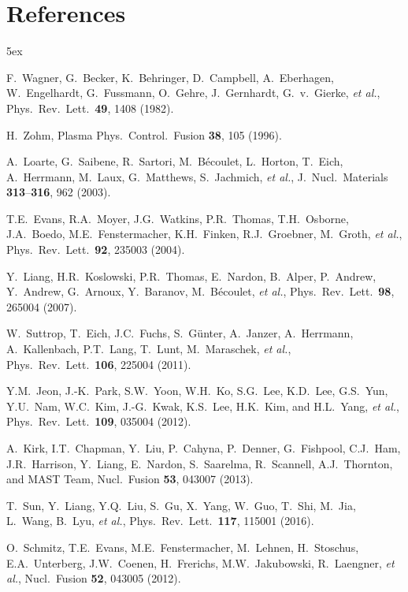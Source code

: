 \documentclass[12pt,prb,aps]{revtex4-1}
\begin{document}
\section*{References}
\begin{thebibliography}{99}\baselineskip 5ex

 F.~Wagner, G.~Becker, K.~Behringer, D.~Campbell, A.~Eberhagen, W.~Engelhardt, G.~Fussmann, O.~Gehre, J.~Gernhardt, G.~v.~Gierke, {\it et al.}, 
Phys.\ Rev.\ Lett.\ {\bf 49}, 1408 (1982).

 H.~Zohm, Plasma Phys.\ Control.\ Fusion {\bf 38}, 105 (1996).

 A.~Loarte, G.~Saibene, R.~Sartori, M.~B\'{e}coulet, L.~Horton, T.~Eich, A.~Herrmann, M.~Laux, G.~Matthews, S.~Jachmich, {\it et al.},  
J.\ Nucl.\ Materials {\bf 313}--{\bf 316}, 962 (2003).

  T.E.~Evans, R.A.~Moyer, J.G.~Watkins, P.R.~Thomas, T.H.~Osborne, J.A.~Boedo, M.E.~Fenstermacher, K.H.~Finken, R.J.~Groebner, M.~Groth, {\it et al.},  
Phys.\ Rev.\ Lett.\ {\bf 92}, 235003 (2004).

 Y.~Liang,  H.R.~Koslowski, P.R.~Thomas, E.~Nardon, B.~Alper, P.~Andrew, Y.~Andrew, G.~Arnoux,  Y.~Baranov, M.~B\'{e}coulet, {\it et al.},  
Phys.\ Rev.\ Lett.\ {\bf 98}, 265004 (2007).

 W.~Suttrop,  T.~Eich, J.C.~Fuchs, S.~G\"{u}nter, A.~Janzer, A.~Herrmann, A.~Kallenbach, P.T.~Lang, T.~Lunt, M.~Maraschek, {\it et al.},   
Phys.\ Rev.\ Lett.\ {\bf 106}, 225004 (2011).

 Y.M.~Jeon,  J.-K.~Park, S.W.~Yoon, W.H.~Ko, S.G.~Lee, K.D.~Lee, G.S.~Yun, Y.U.~Nam, W.C.~Kim, J.-G.~Kwak, K.S.~Lee, H.K.~Kim, and H.L.~Yang, {\it et al.}, 
Phys.\ Rev.\ Lett.\ {\bf 109}, 035004 (2012).

 A.~Kirk, I.T.~Chapman, Y.~Liu, P.~Cahyna, P.~Denner, G.~Fishpool, C.J.~Ham, J.R.~Harrison, Y.~Liang, E.~Nardon, S.~Saarelma, R.~Scannell, A.J.~Thornton, and  MAST Team, 
Nucl.\  Fusion {\bf 53}, 043007 (2013).

 T.~Sun,  Y.~Liang, Y.Q.~Liu, S.~Gu, X.~Yang, W.~Guo, T.~Shi, M.~Jia, L.~Wang, B.~Lyu, {\it et al.},  
Phys.\ Rev.\ Lett.\  {\bf 117}, 115001 (2016).

 O.~Schmitz, T.E.~Evans, M.E.~Fenstermacher, M.~Lehnen, H.~Stoschus, E.A.~Unterberg, J.W.~Coenen, H.~Frerichs, M.W.~Jakubowski, R.~Laengner, {\em et al.}, 
Nucl.\ Fusion {\bf 52}, 043005 (2012). 


\end{thebibliography}
\end{document}
